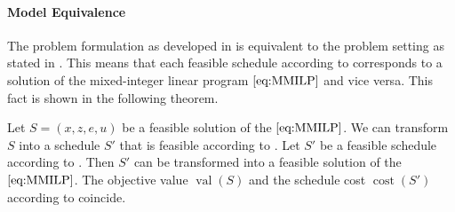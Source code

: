 \newpage

\paragraph{Model Equivalence} \parfill

The problem formulation as developed in  is equivalent to the problem setting as stated in . This means that each feasible schedule according to  corresponds to a solution of the mixed-integer linear program $\eqref{eq:MMILP}$ and vice versa. This fact is shown in the following theorem.

\begin{theorem}
\label{thm:equivalence_setting_mmilp}

Let ${S=\left(x,z,e,u\right)}$ be a feasible solution of the $\eqref{eq:MMILP}$. We can transform $S$ into a schedule $S'$ that is feasible according to . Let $S'$ be a feasible schedule according to . Then $S'$ can be transformed into a feasible solution of the $\eqref{eq:MMILP}$. The objective value $\operatorname{val}(S)$ and the schedule cost $\operatorname{cost}\left(S'\right)$ according to  coincide.

\end{theorem}

